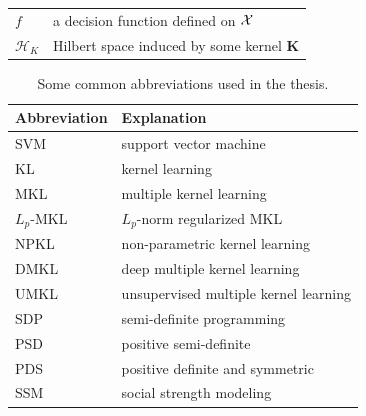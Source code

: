 \begin{table}[!ht]
\begin{center}
\begin{tabular}{ll}
$f$   &a decision function defined on ${\cal X}$\\
$\mathcal H_K$ &Hilbert space induced by some kernel $\mathbf K$\\
\hline
\end{tabular}
\end{center}
\end{table}


\begin{table}[!ht]
\centering \caption{Some common abbreviations used in the thesis. } \label{table:abbreviation}
\begin{center}
\begin{tabular}{ll}
\hline
Abbreviation &Explanation\\
\hline
\hline
SVM & support vector machine\\
KL  & kernel learning\\
MKL & multiple kernel learning\\
$L_p$-MKL & $L_p$-norm regularized MKL\\
NPKL & non-parametric kernel learning\\
DMKL & deep multiple kernel learning\\
UMKL & unsupervised multiple kernel learning\\
SDP & semi-definite programming\\
PSD & positive semi-definite\\
PDS & positive definite and symmetric\\
SSM & social strength modeling\\
\hline
\end{tabular}
\end{center}
\end{table}





